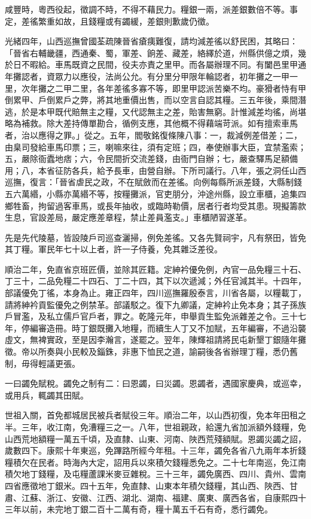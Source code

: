 \begin{pinyinscope}
咸豐時，粵西役起，徵調不時，不得不藉民力。糧銀一兩，派差銀數倍不等。事定，差徭繁重如故，且錢糧或有蠲緩，差銀則歉歲仍徵。

光緒四年，山西巡撫曾國荃疏陳晉省瘡痍難復，請均減差徭以舒民困，其略曰：「晉省右輔畿疆，西通秦、蜀，軍差、餉差、藏差，絡繹於道，州縣供億之煩，幾於日不暇給。車馬既資之民間，役夫亦責之里甲。而各屬辦理不同。有闔邑里甲通年攤認者，資眾力以應役，法尚公允。有分里分甲限年輪認者，初年攤之一甲一里，次年攤之二甲二里，各年差徭多寡不等，即里甲認派苦樂不均。豪猾者恃有甲倒累甲、戶倒累戶之弊，將其地重價出售，而以空言自認其糧。三五年後，乘間潛逃，於是本甲既代賠無主之糧，又代認無主之差，貽害無窮。計惟減差均徭，尚堪略為補救。除大差持傳單勘合，循例支應，其他概不得藉端苛派。如有擅索車馬者，治以應得之罪。」從之。五年，閻敬銘復條陳八事：一，裁減例差借差；二，由臬司發給車馬印票；三，喇嘛來往，須有定班；四，奉使辦事大臣，宜禁濫索；五，嚴除衙蠹地痞；六，令民間折交流差錢，由衙門自辦；七，嚴查驛馬足額備用；八，本省征防各兵，給予長車，由營自辦。下所司議行。八年，張之洞任山西巡撫，復言：「晉省虐民之政，不在賦斂而在差徭。向例每縣所派差錢，大縣制錢五六萬緡，小縣亦萬緡不等，按糧攤派，官吏朋分，沖途州縣，設立車櫃，追集四鄉牲畜，拘留過客車馬，或長年抽收，或臨時勒價，居者行者均受其患。現擬籌款生息，官設差局，嚴定應差章程，禁止差員濫支。」車櫃陋習遂革。

先是先代陵墓，皆設陵戶司巡查灑掃，例免差徭。又各先賢祠宇，凡有祭田，皆免其丁糧。軍民年七十以上者，許一子侍養，免其雜泛差役。

順治二年，免直省京班匠價，並除其匠籍。定紳衿優免例，內官一品免糧三十石、丁三十，二品免糧二十四石、丁二十四，其下以次遞減；外任官減其半。十四年，部議優免丁徭，本身為止。雍正四年，四川巡撫羅殷泰言，川省各屬，以糧載丁，請將紳衿貢監優免之例禁革。部議駁之。復下九卿議，定紳衿止免本身；其子孫族戶冒濫，及私立儒戶官戶者，罪之。乾隆元年，申舉貢生監免派雜差之令。三十七年，停編審造冊。時丁銀既攤入地糧，而續生人丁又不加賦，五年編審，不過沿襲虛文，無裨實政，至是因李瀚言，遂罷之。翌年，陳輝祖請將民屯新墾丁銀隨年攤徵。帝以所奏與小民較及錙銖，非惠下恤民之道，諭嗣後各省辦理丁糧，悉仍舊制，毋得輕議更張。

一曰蠲免賦稅。蠲免之制有二：曰恩蠲，曰災蠲。恩蠲者，遇國家慶典，或巡幸，或用兵，輒蠲其田賦。

世祖入關，首免都城居民被兵者賦役三年。順治二年，以山西初復，免本年田租之半。三年，收江南，免漕糧三之一。八年，世祖親政，給還九省加派額外錢糧，免山西荒地額糧一萬五千頃，及直隸、山東、河南、陜西荒殘額賦。恩蠲災蠲之詔，歲數四下。康熙十年東巡，免蹕路所經今年租。十三年，蠲免各省八九兩年本折錢糧積欠在民者。時海內大定，詔用兵以來積欠錢糧悉免之。二十七年南巡，免江南積欠地丁錢糧，及屯糧蘆課米麥豆雜稅。三十三年，蠲免廣西、四川、貴州、雲南四省應徵地丁銀米。四十五年，免直隸、山東本年積欠錢糧，其山西、陜西、甘肅、江蘇、浙江、安徽、江西、湖北、湖南、福建、廣東、廣西各省，自康熙四十三年以前，未完地丁銀二百十二萬有奇，糧十萬五千石有奇，悉行蠲免。


\end{pinyinscope}
